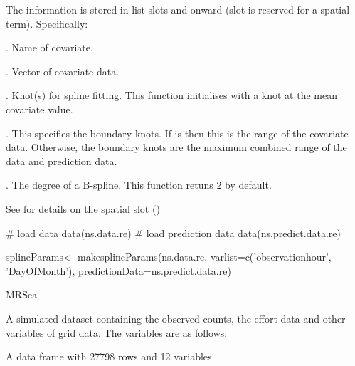\documentclass[a4paper]{book}
\begin{document}
\begin{Details}\relax
The information is stored in list slots \code{[[2]]} and onward (slot \code{[[1]]} is reserved for a spatial term). Specifically: 

. Name of covariate.

. Vector of covariate data.

. Knot(s) for spline fitting.  This function initialises with a knot at the mean covariate value.

. This specifies the boundary knots.  If  is  then this is the range of the covariate data.  Otherwise, the boundary knots are the maximum combined range of the data and prediction data.

. The degree of a B-spline. This function retuns 2 by default.


See  for details on the spatial slot (\code{[[1]]})
\end{Details}
%
\begin{Examples}
\begin{ExampleCode}
# load data
data(ns.data.re)
# load prediction data
data(ns.predict.data.re)

splineParams<- makesplineParams(ns.data.re, varlist=c('observationhour', 'DayOfMonth'),
                predictionData=ns.predict.data.re)

\end{ExampleCode}
\end{Examples}
%
\begin{Description}\relax
MRSea
\end{Description}
%
\begin{Description}\relax
A simulated dataset containing the observed counts, the effort data and other variables of 
grid data. The variables are as follows:
\end{Description}
%
\begin{Format}
A data frame with 27798 rows and 12 variables
\end{Format}
%
\end{document}
